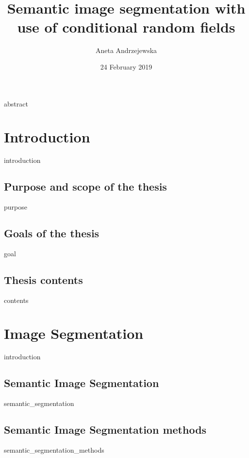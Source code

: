 \documentclass[12pt]{report}
\title{Semantic image segmentation with use of conditional random fields}
\author{Aneta Andrzejewska}
\date{24 February 2019}
\newcommand\blankpage{%
    \null
    \thispagestyle{empty}%
    \addtocounter{page}{-1}%
    \newpage}
\begin{document}
\thispagestyle{empty}%
\addtocounter{page}{-1}%
\begin{titlepage}

\end{titlepage}


\thispagestyle{empty}
{abstract}

\tableofcontents
\newpage

\chapter{Introduction}
    {introduction}
    
    \section{Purpose and scope of the thesis}
    {purpose}
    
    \section{Goals of the thesis}
    {goal}
    
    \section{Thesis contents}
    {contents}

\chapter{Image Segmentation}
    \label{chapter:segmentation}
    {introduction}
    
    \section{Semantic Image Segmentation}
    {semantic_segmentation}
    
    \section{Semantic Image Segmentation methods}
    {semantic_segmentation_methods}
\end{document}
